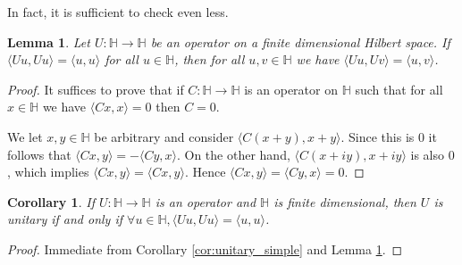 \documentclass[12pt]{article}
\theoremstyle{plain}
\newtheorem{lemma}[thm]{Lemma}
\newtheorem{cor}[thm]{Corollary}
\theoremstyle{definition}
\newcommand{\bb}[1]{\mathbb{#1}}
\newcommand{\lto}{\longrightarrow}
\begin{document}
In fact, it is sufficient to check even less.
\begin{lemma}\label{lem:even_less}
	Let $U: \bb{H} \lto \bb{H}$ be an operator on a finite dimensional Hilbert space. If $\langle Uu, Uu \rangle = \langle u, u \rangle$ for all $u \in \bb{H}$, then for all $u,v \in \bb{H}$ we have $\langle Uu, Uv \rangle = \langle u, v \rangle$.
\end{lemma}
\begin{proof}
	It suffices to prove that if $C: \bb{H} \lto \bb{H}$ is an operator on $\bb{H}$ such that for all $x \in \bb{H}$ we have $\langle Cx, x \rangle = 0$ then $C = 0$.
	
	We let $x,y \in \bb{H}$ be arbitrary and consider $\langle C(x + y), x + y \rangle$. Since this is $0$ it follows that $\langle Cx, y \rangle = -\langle Cy, x \rangle$. On the other hand, $\langle C(x + iy), x + iy\rangle$ is also $0$, which implies $\langle Cx, y \rangle = \langle Cx, y \rangle$. Hence $\langle Cx, y \rangle = \langle Cy, x \rangle = 0$.
\end{proof}
\begin{cor}\label{cor:unitary_true}
	If $U: \bb{H} \lto \bb{H}$ is an operator and $\bb{H}$ is finite dimensional, then $U$ is unitary if and only if $\forall u \in \bb{H}, \langle Uu, Uu \rangle = \langle u, u \rangle$.
\end{cor}
\begin{proof}
	Immediate from Corollary \ref{cor:unitary_simple} and Lemma \ref{lem:even_less}.
\end{proof}
\end{document}
